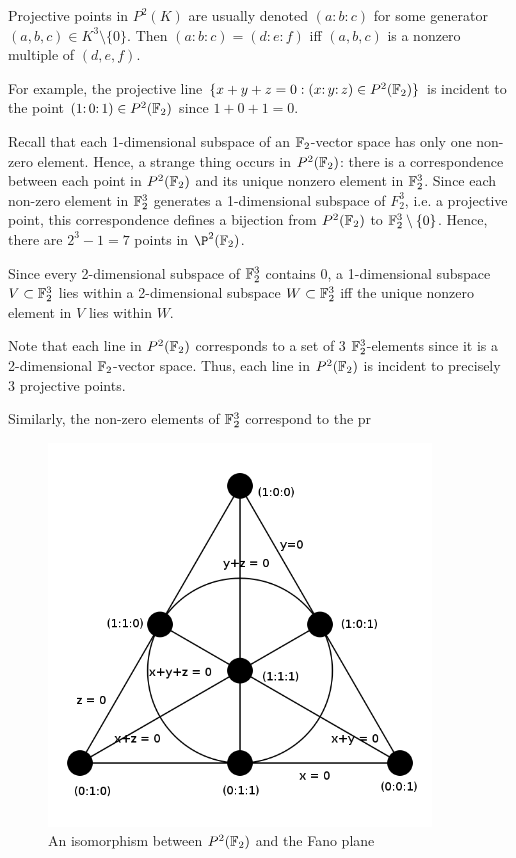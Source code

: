 \documentclass{article}
\begin{document}
Projective points in $P^2(K)$ are usually denoted $(a\mathpunct{:}b\mathpunct{:}c)$ for some generator $(a,b,c) \in K^3\setminus \{0\}$. Then $(a\mathpunct{:}b\mathpunct{:}c) = (d\mathpunct{:}e\mathpunct{:}f)$ iff $(a,b,c)$ is a nonzero multiple of $(d,e,f)$.

For example, the projective line $\{x+y+z=0: (x \mathpunct{:}y\mathpunct{:}z) \in P^2(\mathbb{F}_2)\}$ is incident to the point $(1\mathpunct{:}0\mathpunct{:}1) \in P^2(\mathbb{F}_2)$ since $1+0+1 = 0$.

Recall that each 1-dimensional subspace of an $\mathbb{F}_2$-vector space has only one non-zero element. Hence, a strange thing occurs in $P^2(\mathbb{F}_2)$: there is a correspondence between each point in $P^2(\mathbb{F}_2)$ and its unique nonzero element in $\mathbb{F}_2^3$. Since each non-zero element in $\mathbb{F}_2^3$ generates a 1-dimensional subspace of $F_2^3$, i.e. a projective point, this correspondence defines a bijection from $P^2(\mathbb{F}_2)$ to $\mathbb{F}_2^3\setminus \{0\}$. Hence, there are $2^3 - 1 = 7$ points in $\P^2(\F_2)$. 

Since every 2-dimensional subspace of $\mathbb{F}_2^3$ contains 0, a 1-dimensional subspace $V \subset \mathbb{F}_2^3$ lies within a 2-dimensional subspace $W \subset \mathbb{F}_2^3$ iff the unique nonzero element in $V$ lies within $W$.

Note that each line in $P^2(\mathbb{F}_2)$ corresponds to a set of 3 $\mathbb{F}_2^3$-elements since it is a 2-dimensional $\mathbb{F}_2$-vector space. Thus, each line in $P^2(\mathbb{F}_2)$ is incident to precisely 3 projective points.

Similarly, the non-zero elements of $\mathbb{F}_2^3$ correspond to the pr



\begin{figure}[h]
\centering
\includegraphics[width=4in]{Fano_plane.png}
\caption{An isomorphism between $P^2(\mathbb{F}_2)$ and the Fano plane}
\end{figure}





\end{document}
